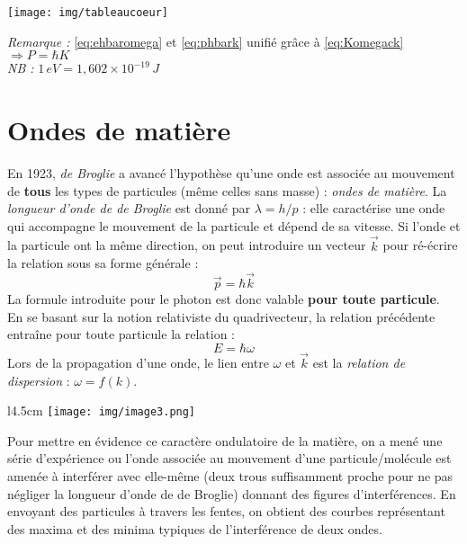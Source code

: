 \documentclass[british,french,11pt, a4paper, openany]{book}
\begin{document}
	\begin{center}
		\texttt{[image: img/tableaucoeur]}
	\end{center}
	\textit{Remarque :} \eqref{eq:ehbaromega} et \eqref{eq:phbark} unifié grâce à \eqref{eq:Komegack}$\Rightarrow P=\hbar K$\\
	\textit{NB :} $1\,eV=1,602\times 10^{-19}\,J$
	\section{Ondes de matière}
	En 1923, \textit{de Broglie} a avancé l'hypothèse qu'une onde est associée au mouvement de \textbf{tous} les types de particules (même celles sans masse) : \textit{ondes de matière}. La \textit{longueur d'onde de de Broglie} est donné par $\lambda = h/p$ : elle caractérise une onde qui accompagne le mouvement de la particule et dépend de sa vitesse. Si l'onde et la particule ont la même direction, on peut introduire un vecteur $\vec{k}$ pour ré-écrire la relation sous sa forme générale :
	\begin{equation}
		\vec p = \hbar \vec{k}
	\end{equation}
	La formule introduite pour le photon est donc valable \textbf{pour toute particule}.\\
	En se basant sur la notion relativiste du quadrivecteur, la relation précédente entraîne pour toute particule la relation :
	\begin{equation}
		E = \hbar\omega
	\end{equation}
	Lors de la propagation d'une onde, le lien entre $\omega$ et $\vec{k}$ est la \textit{relation de dispersion} : $\omega = f(k)$.\\
	
	\begin{wrapfigure}[9]{l}{4.5cm}
		\texttt{[image: img/image3.png]}
	\end{wrapfigure}
	Pour mettre en évidence ce caractère ondulatoire de la matière, on a mené une série d'expérience ou l'onde associée au mouvement d'une particule/molécule est amenée à interférer avec elle-même (deux trous suffisamment proche pour ne pas négliger la longueur d'onde de de Broglie) donnant des figures d'interférences. En envoyant des particules à travers les fentes, on obtient des courbes représentant des maxima et des minima typiques de l’interférence de deux ondes.\\
	
\end{document}
